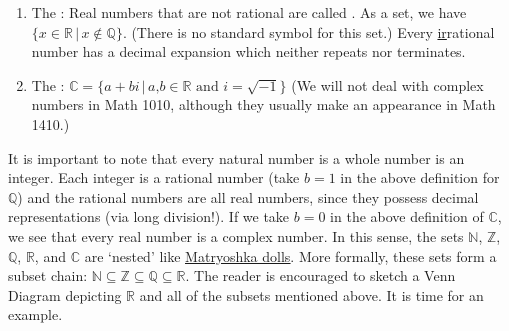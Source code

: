 \begin{minipage}{1.2\linewidth}
{\begin{enumerate}
\item The : Real numbers that are not rational are called .  As a set, we have  $\{x\in\mathbb{R}\,|\, x\notin \mathbb{Q}\}$. (There is no standard symbol for this set.)  Every \underline{ir}rational number has a decimal expansion which neither repeats nor terminates.

\item The : $\mathbb C=\{a+bi\,|\,\mbox{$a$,$b \in \mathbb R$ and $i=\sqrt{-1}$}\}$  (We will not deal with complex numbers in Math 1010, although they usually make an appearance in Math 1410.)

\end{enumerate}
}
\end{minipage}
\restoreboxwidth

\medskip


\medskip


It is important to note that every natural number is a whole number is an integer.   Each integer is a rational number (take $b =1$ in the above definition for $\mathbb Q$) and the rational numbers are all real numbers, since they possess decimal representations (via long division!). If we take $b=0$ in the above definition of $\mathbb C$, we see that every real number is a complex number.  In this sense, the sets $\mathbb N$, $\mathbb Z$, $\mathbb Q$, $\mathbb R$, and $\mathbb C$ are `nested' like \href{http://en.wikipedia.org/wiki/Matryoshka_doll}{\underline{Matryoshka dolls}}. More formally, these sets form a subset chain:  $\mathbb{N} \subseteq \mathbb Z \subseteq \mathbb{Q} \subseteq \mathbb{R}$.  The reader is encouraged to sketch a Venn Diagram depicting $\mathbb{R}$ and all of the subsets mentioned above.  It is time for an example.

\medskip


